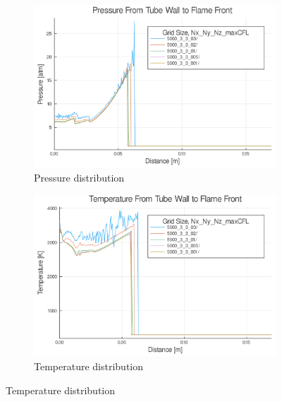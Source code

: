 \begin{figure}[]
    \centering
    \begin{subfigure}[]{\textwidth}
    \centering
    \includegraphics[width=\linewidth]{figs/cfl_test/p.png}
    \caption{Pressure distribution}
    \label{fig:cflp}
    \end{subfigure}

    \begin{subfigure}[]{\textwidth}
    \centering
    \includegraphics[width=\linewidth]{figs/cfl_test/t.png}
    \caption{Temperature distribution}
    \label{fig:cflt}
    \end{subfigure}
\end{figure}
